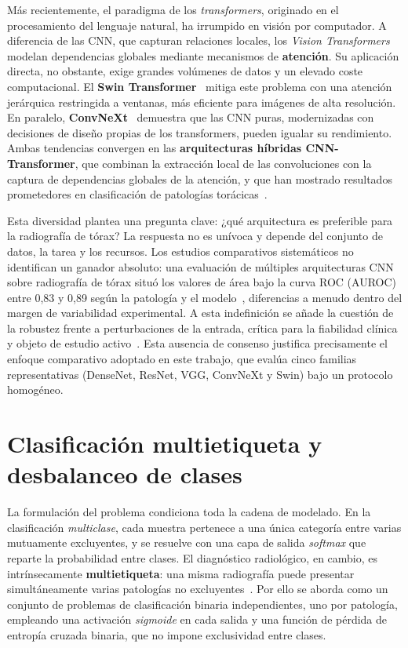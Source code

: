 Más recientemente, el paradigma de los \textit{transformers}, originado en el
procesamiento del lenguaje natural, ha irrumpido en visión por computador. A
diferencia de las CNN, que capturan relaciones locales, los \textit{Vision
Transformers} modelan dependencias globales mediante mecanismos de
\textbf{atención}. Su aplicación directa, no obstante, exige grandes volúmenes de
datos y un elevado coste computacional. El \textbf{Swin
Transformer}~\cite{liuSwinTransformer2021} mitiga este problema con una atención
jerárquica restringida a ventanas, más eficiente para imágenes de alta
resolución. En paralelo, \textbf{ConvNeXt}~\cite{liuConvNet2020s2022} demuestra
que las CNN puras, modernizadas con decisiones de diseño propias de los
transformers, pueden igualar su rendimiento. Ambas tendencias convergen en las
\textbf{arquitecturas híbridas CNN-Transformer}, que combinan la extracción local
de las convoluciones con la captura de dependencias globales de la atención, y que
han mostrado resultados prometedores en clasificación de patologías
torácicas~\cite{singhComputerAidedDiagnosis2024, oommenConvAttentionViT2024,
fuExplainableHybridTransformer2025}.

Esta diversidad plantea una pregunta clave: ¿qué arquitectura es preferible para
la radiografía de tórax? La respuesta no es unívoca y depende del conjunto de
datos, la tarea y los recursos. Los estudios comparativos sistemáticos no
identifican un ganador absoluto: una evaluación de múltiples arquitecturas CNN
sobre radiografía de tórax situó los valores de área bajo la curva ROC (AUROC)
entre 0,83 y 0,89 según la patología y el
modelo~\cite{bressemComparingDeepLearning2020}, diferencias a menudo dentro del
margen de variabilidad experimental. A esta indefinición se añade la cuestión de
la robustez frente a perturbaciones de la entrada, crítica para la fiabilidad
clínica y objeto de estudio activo~\cite{liuComprehensiveStudyRobustness2025}.
Esta ausencia de consenso justifica precisamente el enfoque comparativo adoptado
en este trabajo, que evalúa cinco familias representativas (DenseNet, ResNet, VGG,
ConvNeXt y Swin) bajo un protocolo homogéneo.


\section{Clasificación multietiqueta y desbalanceo de clases}
\label{sec::ec_multietiqueta}

La formulación del problema condiciona toda la cadena de modelado. En la
clasificación \textit{multiclase}, cada muestra pertenece a una única categoría
entre varias mutuamente excluyentes, y se resuelve con una capa de salida
\textit{softmax} que reparte la probabilidad entre clases. El diagnóstico
radiológico, en cambio, es intrínsecamente \textbf{multietiqueta}: una misma
radiografía puede presentar simultáneamente varias patologías no
excluyentes~\cite{zhangReviewMultiLabel2014}. Por ello se aborda como un conjunto
de problemas de clasificación binaria independientes, uno por patología,
empleando una activación \textit{sigmoide} en cada salida y una función de
pérdida de entropía cruzada binaria, que no impone exclusividad entre clases.

